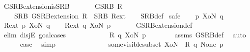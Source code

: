 \begin{isabellebody}
%
\isadelimunimportant
%
\endisadelimunimportant
%
\isatagunimportant
%
\endisatagunimportant
{\isafoldunimportant}%
%
\isadelimunimportant
\isanewline
%
\endisadelimunimportant
{}\isamarkupfalse%
\ GSRB{\isacharunderscore}{\kern0pt}extension{\isacharunderscore}{\kern0pt}is{\isacharunderscore}{\kern0pt}SRB{\isacharcolon}{\kern0pt}\isanewline
\ \ \isanewline
\ \ \ \ {\isacartoucheopen}GSRB\ R{\isacartoucheclose}\isanewline
\ \ \isanewline
\ \ \ \ {\isacartoucheopen}SRB\ {\isacharparenleft}{\kern0pt}GSRB{\isacharunderscore}{\kern0pt}extension\ R{\isacharparenright}{\kern0pt}{\isacartoucheclose}\ {\isacharparenleft}{\kern0pt}\ {\isacartoucheopen}SRB\ {\isacharquery}{\kern0pt}R{\isacharunderscore}{\kern0pt}ext{\isacartoucheclose}{\isacharparenright}{\kern0pt}\isanewline
%
\isadelimproof
\ \ %
\endisadelimproof
%
\isatagproof
{}\isamarkupfalse%
\ SRB{\isacharunderscore}{\kern0pt}def\isanewline
{}\isamarkupfalse%
\ {\isacharparenleft}{\kern0pt}safe{\isacharparenright}{\kern0pt}\isanewline
\ \ \isamarkupfalse%
\ p\ XoN\ q\isanewline
\ \ \isamarkupfalse%
\ {\isacartoucheopen}{\isacharquery}{\kern0pt}R{\isacharunderscore}{\kern0pt}ext\ p\ XoN\ q{\isacartoucheclose}\isanewline
\ \ \isamarkupfalse%
\ {\isacartoucheopen}{\isacharquery}{\kern0pt}R{\isacharunderscore}{\kern0pt}ext\ q\ XoN\ p{\isacartoucheclose}\ \isanewline
\ \ \ \ \isamarkupfalse%
\ GSRB{\isacharunderscore}{\kern0pt}extension{\isacharunderscore}{\kern0pt}def\isanewline
\ \ \isamarkupfalse%
\ {\isacharparenleft}{\kern0pt}elim\ disjE{\isacharcomma}{\kern0pt}\ goal{\isacharunderscore}{\kern0pt}cases{\isacharparenright}{\kern0pt}\isanewline
\ \ \ \ \isamarkupfalse%
\ {}\isanewline
\ \ \ \ \isamarkupfalse%
\ {\isacartoucheopen}R\ q\ XoN\ p{\isacartoucheclose}\isanewline
\ \ \ \ \ \ \isamarkupfalse%
\ assms\ GSRB{\isacharunderscore}{\kern0pt}def\ \isamarkupfalse%
\ auto\isanewline
\ \ \ \ \isamarkupfalse%
\ {\isacharquery}{\kern0pt}case\ \isamarkupfalse%
\ simp\isanewline
\ \ \isamarkupfalse%
\isanewline
\ \ \ \ \isamarkupfalse%
\ {}\isanewline
\ \ \ \ \isamarkupfalse%
\ {\isacartoucheopen}some{\isacharunderscore}{\kern0pt}visible{\isacharunderscore}{\kern0pt}subset\ XoN\ {\isasymand}\ R\ q\ None\ p{\isacartoucheclose}\isanewline
\ \ \ \ \ \ \isamarkupfalse%

\end{isabellebody}
